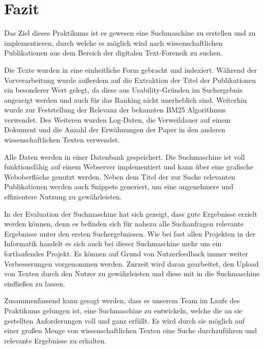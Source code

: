 
\section{Fazit}

Das Ziel dieses Praktikums ist es gewesen eine Suchmaschine zu
erstellen und zu implementieren, durch welche es möglich wird nach
wissenschaftlichen Publikationen aus dem Bereich der digitalen
Text-Forensik zu suchen.

Die Texte wurden in eine einheitliche Form gebracht und
indexiert. Während der Vorverarbeitung wurde außerdem auf die
Extraktion der Titel der Publikationen ein besonderer Wert gelegt, da
diese aus Usability-Gründen im Suchergebnis angezeigt werden und auch
für das Ranking nicht unerheblich sind. Weiterhin wurde zur
Feststellung der Relevanz der bekannten BM25 Algorithmus
verwendet. Des Weiteren wurden Log-Daten, die Verweildauer auf einem
Dokument und die Anzahl der Erwähnungen der Paper in den anderen
wissenschaftlichen Texten verwendet.

Alle Daten werden in einer Datenbank gespeichert. Die Suchmaschine ist
voll funktionsfähig auf einem Webserver implementiert und kann über
eine grafische Weboberfläche genutzt werden. Neben dem Titel der zur
Suche relevanten Publikationen werden auch Snippets generiert, um eine
angenehmere und effizientere Nutzung zu gewährleisten.

In der Evaluation der Suchmaschine hat sich gezeigt, dass gute
Ergebnisse erzielt werden können, denn es befinden sich für nahezu
alle Suchanfragen relevante Ergebnisse unter den ersten
Suchergebnissen.  Wie bei fast allen Projekten in der Informatik
handelt es sich auch bei dieser Suchmaschine mehr um ein fortlaufendes
Projekt. Es können auf Grund von Nutzerfeedback immer weiter
Verbesserungen vorgenommen werden. Zurzeit wird daran gearbeitet, den
Upload von Texten durch den Nutzer zu gewährleisten und diese mit in
die Suchmaschine einfließen zu lassen.

Zusammenfassend kann gesagt werden, dass es unserem Team im Laufe des
Praktikums gelungen ist, eine Suchmaschine zu entwickeln, welche die
an sie gestellten Anforderungen voll und ganz erfüllt. Es wird durch
sie möglich auf einer großen Menge von wissenschaftlichen Texten eine
Suche durchzuführen und relevante Ergebnisse zu erhalten.

